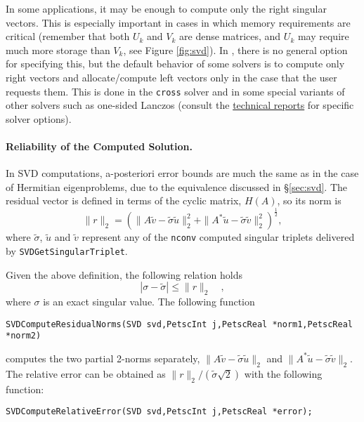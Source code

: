 In some applications, it may be enough to compute only the right singular vectors. This is especially important in cases in which memory requirements are critical (remember that both $U_k$ and $V_k$ are dense matrices, and $U_k$ may require much more storage than $V_k$, see Figure \ref{fig:svd}). In \slepc, there is no general option for specifying this, but the default behavior of some solvers is to compute only right vectors and allocate/compute left vectors only in the case that the user requests them. This is done in the \texttt{cross} solver and in some special variants of other solvers such as one-sided Lanczos (consult the \slepc \hyperlink{str}{technical reports} for specific solver options).

\paragraph{Reliability of the Computed Solution.}

In SVD computations, a-posteriori error bounds are much the same as in the case of Hermitian eigenproblems, due to the equivalence discussed in \S\ref{sec:svd}. The residual vector is defined in terms of the cyclic matrix, $H(A)$, so its norm is
\begin{equation}
\|r\|_2=\left(\|A\tilde{v}-\tilde{\sigma}\tilde{u}\|_2^2+\|A^*\tilde{u}-\tilde{\sigma}\tilde{v}\|_2^2\right)^{\frac{1}{2}},
\end{equation}
where $\tilde{\sigma}$, $\tilde{u}$ and $\tilde{v}$ represent any of the \texttt{nconv} computed singular triplets delivered by \texttt{SVDGetSingularTriplet}.

Given the above definition, the following relation holds
\begin{equation}
|\sigma-\tilde{\sigma}|\leq \|r\|_2\quad,
\end{equation}
where $\sigma$ is an exact singular value. The following \slepc function 
	\begin{Verbatim}[fontsize=\small]
	SVDComputeResidualNorms(SVD svd,PetscInt j,PetscReal *norm1,PetscReal *norm2)
	\end{Verbatim}
computes the two partial 2-norms separately, $\|A\tilde{v}-\tilde{\sigma}\tilde{u}\|_2$ and $\|A^*\tilde{u}-\tilde{\sigma}\tilde{v}\|_2$. The relative error can be obtained as $\|r\|_2/\left(\tilde{\sigma}\sqrt{2}\right)$ with the following function:
	\begin{Verbatim}[fontsize=\small]
	SVDComputeRelativeError(SVD svd,PetscInt j,PetscReal *error);
	\end{Verbatim}

